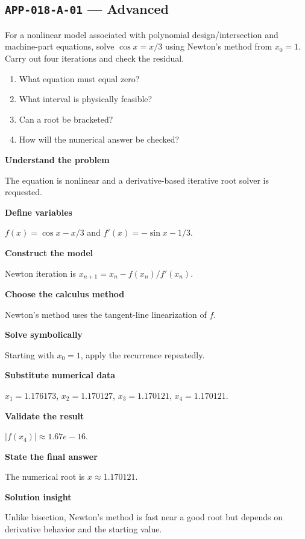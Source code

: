 \documentclass[11pt]{book}
\newcommand{\pid}[1]{\texttt{#1}}
\begin{document}
\subsection*{\pid{APP-018-A-01} — Advanced}
\begin{problembox}
For a nonlinear model associated with polynomial design/intersection and machine-part equations, solve $\cos x=x/3$ using Newton's method from $x_0=1$. Carry out four iterations and check the residual.
\end{problembox}
\begin{promptbox}\begin{enumerate}
\item What equation must equal zero?
\item What interval is physically feasible?
\item Can a root be bracketed?
\item How will the numerical answer be checked?
\end{enumerate}\end{promptbox}
\begin{solutionbox}
\textbf{Understand the problem}\par The equation is nonlinear and a derivative-based iterative root solver is requested.\par\medskip
\textbf{Define variables}\par $f(x)=\cos x-x/3$ and $f'(x)=-\sin x-1/3$.\par\medskip
\textbf{Construct the model}\par Newton iteration is $x_{n+1}=x_n-f(x_n)/f'(x_n)$.\par\medskip
\textbf{Choose the calculus method}\par Newton’s method uses the tangent-line linearization of $f$.\par\medskip
\textbf{Solve symbolically}\par Starting with $x_0=1$, apply the recurrence repeatedly.\par\medskip
\textbf{Substitute numerical data}\par $x_1=1.176173$, $x_2=1.170127$, $x_3=1.170121$, $x_4=1.170121$.\par\medskip
\textbf{Validate the result}\par $|f(x_4)|\approx 1.67e-16$.\par\medskip
\textbf{State the final answer}\par The numerical root is $x\approx 1.170121$.\par\medskip
\textbf{Solution insight}\par Unlike bisection, Newton’s method is fast near a good root but depends on derivative behavior and the starting value.\par\medskip
\end{solutionbox}
\end{document}

